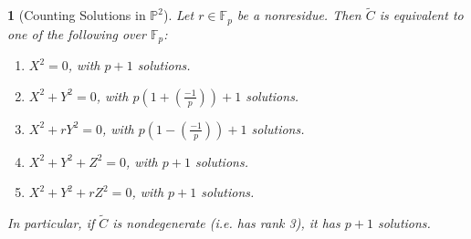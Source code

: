 \documentclass[10pt,a4paper]{amsart}
\numberwithin{equation}{section}
\numberwithin{figure}{section}
\numberwithin{table}{section}
\theoremstyle{definition}
\theoremstyle{plain}
\theoremstyle{remark}
\theoremstyle{plain}
\theoremstyle{definition}
\theoremstyle{plain}
\newtheorem{prop}[thm]{\protect\propositionname}
\theoremstyle{plain}
\providecommand{\propositionname}{Proposition}
\newcommand{\legendre}[2]{\genfrac{(}{)}{}{}{#1}{#2}}
\renewcommand{\P}{\mathbb{P}}
\newcommand{\F}{\mathbb{F}}
\begin{document}
	\begin{prop}[Counting Solutions in $\P^2$]
		\label{prop:counting-P2-solutions}
		Let $r\in \F_p$ be a nonresidue. Then $\widetilde{C}$ is equivalent to one of the following over $\F_p$:
		\begin{enumerate} 
			\item\label{case:rank1_x^2=0} $X^2 = 0$, with $p+1$ solutions.
			\item\label{case:rank2_x^2+y^2=0} $X^2 + Y^2 = 0$, with
			$p(1+\legendre{-1}{p}) + 1$ solutions.
			\item\label{case:rank2_x^2+ry^2=0} $X^2 + rY^2 = 0$, with
			$p(1-\legendre{-1}{p}) + 1$ solutions.
			\item\label{case:rank3_x^2+y^2+z^2=0} $X^2 + Y^2 + Z^2 = 0$, with $p+1$ solutions.
			\item\label{case:rank3_x^2+y^2+rz^2=0} $X^2 + Y^2 + rZ^2 = 0$, with $p+1$ solutions.
		\end{enumerate}
		In particular, if $\widetilde{C}$ is nondegenerate (i.e. has rank 3), it has $p+1$ solutions.
	\end{prop}
\end{document}
